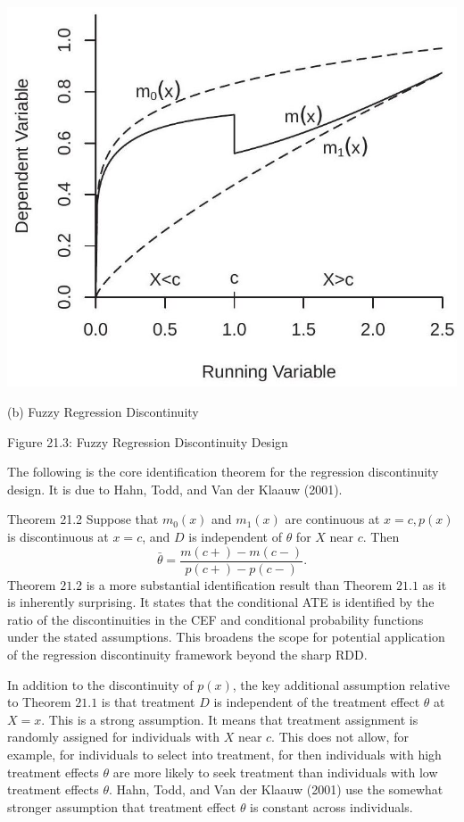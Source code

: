 \documentclass[10pt]{article}
\begin{document}
\includegraphics[max width=\textwidth]{2022_10_23_bb8a8d8a5dc56cf142a9g-11(1)}

(b) Fuzzy Regression Discontinuity

Figure 21.3: Fuzzy Regression Discontinuity Design

The following is the core identification theorem for the regression discontinuity design. It is due to Hahn, Todd, and Van der Klaauw (2001).

Theorem 21.2 Suppose that $m_{0}(x)$ and $m_{1}(x)$ are continuous at $x=c, p(x)$ is discontinuous at $x=c$, and $D$ is independent of $\theta$ for $X$ near $c$. Then
$$
\bar{\theta}=\frac{m(c+)-m(c-)}{p(c+)-p(c-)} .
$$
Theorem $21.2$ is a more substantial identification result than Theorem $21.1$ as it is inherently surprising. It states that the conditional ATE is identified by the ratio of the discontinuities in the CEF and conditional probability functions under the stated assumptions. This broadens the scope for potential application of the regression discontinuity framework beyond the sharp RDD.

In addition to the discontinuity of $p(x)$, the key additional assumption relative to Theorem $21.1$ is that treatment $D$ is independent of the treatment effect $\theta$ at $X=x$. This is a strong assumption. It means that treatment assignment is randomly assigned for individuals with $X$ near $c$. This does not allow, for example, for individuals to select into treatment, for then individuals with high treatment effects $\theta$ are more likely to seek treatment than individuals with low treatment effects $\theta$. Hahn, Todd, and Van der Klaauw (2001) use the somewhat stronger assumption that treatment effect $\theta$ is constant across individuals.
\end{document}
